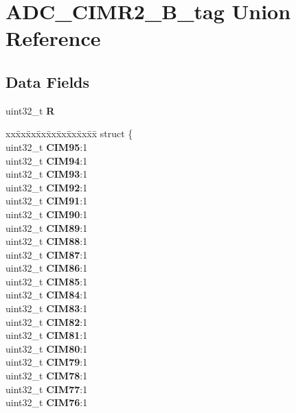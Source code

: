\hypertarget{unionADC__CIMR2__32B__tag}{}\section{A\+D\+C\+\_\+\+C\+I\+M\+R2\+\_\+B\+\_\+tag Union Reference}
\label{unionADC__CIMR2__32B__tag}
\subsection*{Data Fields}
\begin{DoxyCompactItemize}
\item 
\mbox{\label{unionADC__CIMR2__32B__tag_a091b010ae5af032201e27367dd473926}} 
uint32\+\_\+t {\bfseries R}
\item 
\mbox{\label{unionADC__CIMR2__32B__tag_a66c9a7682eeac0a5b76f34b82344ad99}} 
\begin{tabbing}
xx\=xx\=xx\=xx\=xx\=xx\=xx\=xx\=xx\=\kill
struct \{\\
\>uint32\_t {\bfseries CIM95}:1\\
\>uint32\_t {\bfseries CIM94}:1\\
\>uint32\_t {\bfseries CIM93}:1\\
\>uint32\_t {\bfseries CIM92}:1\\
\>uint32\_t {\bfseries CIM91}:1\\
\>uint32\_t {\bfseries CIM90}:1\\
\>uint32\_t {\bfseries CIM89}:1\\
\>uint32\_t {\bfseries CIM88}:1\\
\>uint32\_t {\bfseries CIM87}:1\\
\>uint32\_t {\bfseries CIM86}:1\\
\>uint32\_t {\bfseries CIM85}:1\\
\>uint32\_t {\bfseries CIM84}:1\\
\>uint32\_t {\bfseries CIM83}:1\\
\>uint32\_t {\bfseries CIM82}:1\\
\>uint32\_t {\bfseries CIM81}:1\\
\>uint32\_t {\bfseries CIM80}:1\\
\>uint32\_t {\bfseries CIM79}:1\\
\>uint32\_t {\bfseries CIM78}:1\\
\>uint32\_t {\bfseries CIM77}:1\\
\>uint32\_t {\bfseries CIM76}:1\\

\end{tabbing}
\end{DoxyCompactItemize}
